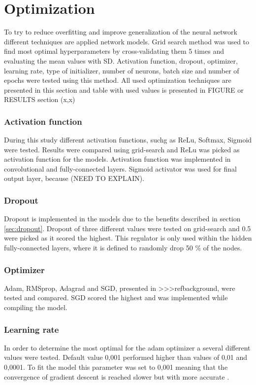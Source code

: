 \section{Optimization}
To try to reduce overfitting and improve generalization of the neural network different techniques are applied network models. Grid search method was used to find most optimal hyperparameters by cross-validating them 5 times and evaluating the mean values with SD. Activation function, dropout, optimizer, learning rate, type of initializer, number of neurons, batch size and number of epochs were tested using this method.  All used optimization techniques are presented in this section and table with used values is presented in FIGURE or RESULTS section (x,x)

\subsubsection{Activation function}
During this study different activation functions, suchg as ReLu, Softmax, Sigmoid were tested. Results were compared using grid-search and ReLu was picked as activation function for the models. Activation function was implemented in convolutional and fully-connected layers. Sigmoid activator was used for final output layer, because (NEED TO EXPLAIN).

\subsubsection{Dropout}
Dropout is implemented in the models due to the benefits described in section \ref{sec:dropout}. Dropout of three different values were tested on grid-search and 0.5 were picked as it scored the highest. This regulator is only used within the hidden fully-connected layers, where it is defined to randomly drop 50 \% of the nodes.

\subsubsection{Optimizer}
Adam, RMSprop, Adagrad and SGD, presented in >>>ref{background}, were tested and compared. SGD scored the highest and was implemented while compiling the model.

\subsubsection{Learning rate}
In order to determine the most optimal  for the adam optimizer a several different values were tested. Default value 0,001 performed higher than values of 0,01 and 0,0001. To fit the model this parameter was set to 0,001 meaning that the convergence of gradient descent is reached slower but with more accurate . 

